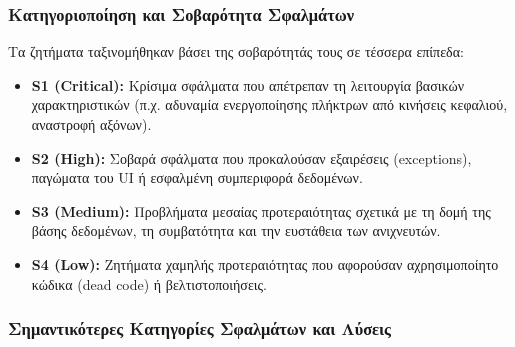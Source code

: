 \documentclass[twoside, a4paper, 11pt]{article}
\newcommand{\textlatin}[1]{\textenglish{#1}}
\begin{document}
\subsubsection{Κατηγοριοποίηση και Σοβαρότητα Σφαλμάτων}
Τα ζητήματα ταξινομήθηκαν βάσει της σοβαρότητάς τους σε τέσσερα επίπεδα:
\begin{itemize}
    \item \textbf{S1 (Critical):} Κρίσιμα σφάλματα που απέτρεπαν τη λειτουργία βασικών χαρακτηριστικών (π.χ. αδυναμία ενεργοποίησης πλήκτρων από κινήσεις κεφαλιού, αναστροφή αξόνων).
    \item \textbf{S2 (High):} Σοβαρά σφάλματα που προκαλούσαν εξαιρέσεις (\textlatin{exceptions}), παγώματα του UI ή εσφαλμένη συμπεριφορά δεδομένων.
    \item \textbf{S3 (Medium):} Προβλήματα μεσαίας προτεραιότητας σχετικά με τη δομή της βάσης δεδομένων, τη συμβατότητα και την ευστάθεια των ανιχνευτών.
    \item \textbf{S4 (Low):} Ζητήματα χαμηλής προτεραιότητας που αφορούσαν αχρησιμοποίητο κώδικα (\textlatin{dead code}) ή βελτιστοποιήσεις.
\end{itemize}

\subsubsection{Σημαντικότερες Κατηγορίες Σφαλμάτων και Λύσεις}
\end{document}
